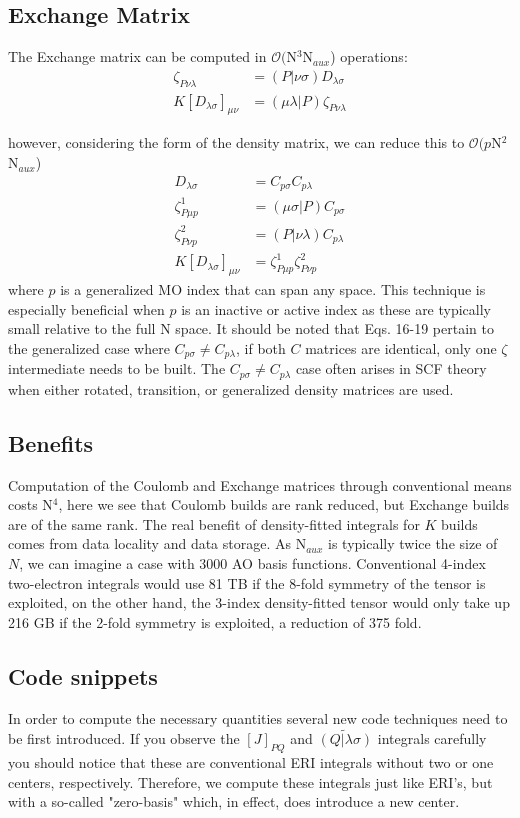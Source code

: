 \documentclass[aip,jcp,preprint,superscriptaddress,floatfix]{revtex4-1}
\begin{document}
\subsection{Exchange Matrix}
The Exchange matrix can be computed in $\mathcal{O}($N$^3$N$_{aux}$) operations:
\begin{align}
\zeta_{P \nu\lambda} &= (P| \nu \sigma) D_{ \lambda \sigma} \\
K[D_{ \lambda \sigma}]_{\mu \nu} &= (\mu \lambda |P) \zeta_{P\nu\lambda} 
\end{align}

however, considering the form of the density matrix, we can reduce this to $\mathcal{O}(p$N$^2$N$_{aux}$)
\begin{align}
D_{\lambda \sigma} &= C_{p\sigma}C_{p\lambda}\\
\zeta^1_{P \mu p} &= (\mu \sigma | P) C_{ p \sigma} \\
\zeta^2_{P \nu p} &= (P| \nu \lambda) C_{ p \lambda} \\
K[D_{ \lambda \sigma}]_{\mu \nu} &= \zeta^1_{P \mu p} \zeta^2_{P \nu p}
\end{align}
where $p$ is a generalized MO index that can span any space.
This technique is especially beneficial when $p$ is an inactive or active index as these are typically small relative to the full N space.
It should be noted that Eqs. 16-19 pertain to the generalized case where $C_{p\sigma} \neq C_{p\lambda}$, if both $C$ matrices are identical, only one $\zeta$ intermediate needs to be built.
The $C_{p\sigma} \neq C_{p\lambda}$ case often arises in SCF theory when either rotated, transition, or generalized density matrices are used.

\subsection{Benefits}
Computation of the Coulomb and Exchange matrices through conventional means costs N$^4$, here we see that Coulomb builds are rank reduced, but Exchange builds are of the same rank.
The real benefit of density-fitted integrals for $K$ builds comes from data locality and data storage.
As N$_{aux}$ is typically twice the size of $N$, we can imagine a case with 3000 AO basis functions.
Conventional 4-index two-electron integrals would use 81 TB if the 8-fold symmetry of the tensor is exploited, on the other hand, the 3-index density-fitted tensor would only take up 216 GB if the 2-fold symmetry is exploited, a reduction of 375 fold.

\subsection{Code snippets}
In order to compute the necessary quantities several new code techniques need to be first introduced.
If you observe the $[J]_{PQ} $ and $\widetilde{(Q| \lambda \sigma)} $ integrals carefully you should
notice that these are conventional ERI integrals without two or one centers, respectively.
Therefore, we compute these integrals just like ERI's, but with a so-called "zero-basis" which,
in effect, does introduce a new center.
\end{document}
